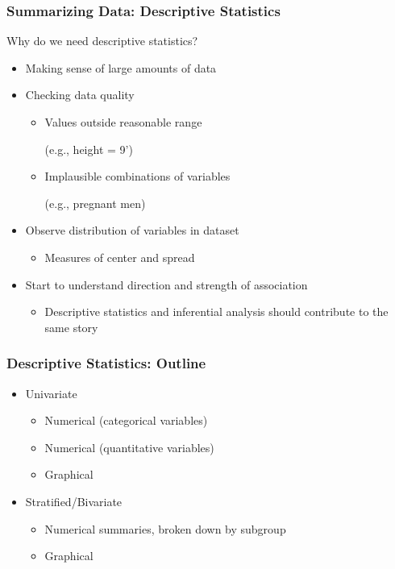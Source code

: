 \documentclass[12pt, 
hyperref={colorlinks=true, linkcolor=blue, urlcolor=cyan}]{beamer}
\begin{document}
\begin{frame}
\frametitle{Summarizing Data: Descriptive Statistics}
Why do we need descriptive statistics?\vspace{-0.2cm}
\begin{itemize}
\item Making sense of large amounts of data
\item Checking data quality
	\begin{itemize}
	\item Values outside reasonable range \begin{footnotesize} (e.g., height = 9') \end{footnotesize}
	\item Implausible combinations of variables \begin{footnotesize} (e.g., pregnant men) \end{footnotesize}
	\end{itemize}
\item Observe distribution of variables in dataset
	\begin{itemize}
	\item Measures of center and spread
	\end{itemize}
\item Start to understand direction and strength of association
	\begin{itemize}
	\item Descriptive statistics and inferential analysis should contribute to the same story
	\end{itemize}
\end{itemize}
\end{frame}

\begin{frame}
\frametitle{Descriptive Statistics: Outline}

\begin{itemize}
\item Univariate
	\begin{itemize}
	\item Numerical (categorical variables)
	\item Numerical (quantitative variables)
	\item Graphical
	\end{itemize}
\item Stratified/Bivariate
	\begin{itemize}
	\item Numerical summaries, broken down by subgroup
	\item Graphical
	\end{itemize}
\end{itemize}

\end{frame}
\end{document}

